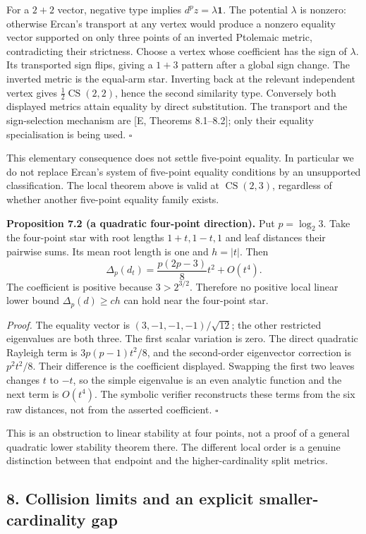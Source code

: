 \documentclass[11pt,a4paper]{article}
\begin{document}
For a \(2+2\) vector, negative type implies \(d^p z=\lambda\mathbf1\).
The potential \(\lambda\) is nonzero: otherwise Ercan's transport at any
vertex would produce a nonzero equality vector supported on only three
points of an inverted Ptolemaic metric, contradicting their strictness.
Choose a vertex whose coefficient has the sign of \(\lambda\). Its
transported sign flips, giving a \(1+3\) pattern after a global sign
change. The inverted metric is the equal-arm star. Inverting back at the
relevant independent vertex gives \(\tfrac12\operatorname{CS}(2,2)\),
hence the second similarity type. Conversely both displayed metrics
attain equality by direct substitution. The transport and the
sign-selection mechanism are {[}E, Theorems 8.1--8.2{]}; only their
equality specialisation is being used. \(\square\)

This elementary consequence does not settle five-point equality. In
particular we do not replace Ercan's system of five-point equality
conditions by an unsupported classification. The local theorem above is
valid at \(\operatorname{CS}(2,3)\), regardless of whether another
five-point equality family exists.

\textbf{Proposition 7.2 (a quadratic four-point direction).} Put
\(p=\log_2 3\). Take the four-point star with root lengths \(1+t,1-t,1\)
and leaf distances their pairwise sums. Its mean root length is one and
\(h=|t|\). Then \[\boxed{\Delta_p(d_t)=\frac{p(2p-3)}8t^2+O(t^4).}\] The
coefficient is positive because \(3>2^{3/2}\). Therefore no positive
local linear lower bound \(\Delta_p(d)\ge c h\) can hold near the
four-point star.

\emph{Proof.} The equality vector is \((3,-1,-1,-1)/\sqrt{12}\); the
other restricted eigenvalues are both three. The first scalar variation
is zero. The direct quadratic Rayleigh term is \(3p(p-1)t^2/8\), and the
second-order eigenvector correction is \(p^2t^2/8\). Their difference is
the coefficient displayed. Swapping the first two leaves changes \(t\)
to \(-t\), so the simple eigenvalue is an even analytic function and the
next term is \(O(t^4)\). The symbolic verifier reconstructs these terms
from the six raw distances, not from the asserted coefficient.
\(\square\)

This is an obstruction to linear stability at four points, not a proof
of a general quadratic lower stability theorem there. The different
local order is a genuine distinction between that endpoint and the
higher-cardinality split metrics.

\subsection{8. Collision limits and an explicit smaller-cardinality
gap}\label{collision-limits-and-an-explicit-smaller-cardinality-gap}
\end{document}
